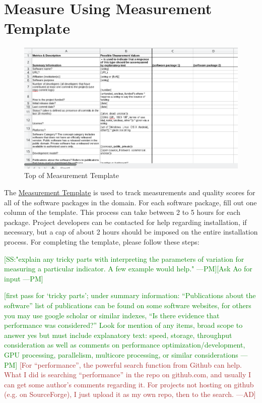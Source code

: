 \documentclass[letterpaper,cleveref]{lipics-v2019}
\newcommand{\authornote}[3]{\textcolor{#1}{[#3 ---#2]}}
\newcommand{\authornote}[3]{}
\newcommand{\pmi}[1]{\authornote{green}{PM}{#1}} %
\newcommand{\ad}[1]{\authornote{brown}{AD}{#1}} %
\theoremstyle{definition}
\begin{document}
\section{Measure Using Measurement Template} \label{SecShallowMeasure}

\begin{figure}[h!]
	\begin{center}
		\includegraphics[width=1.0\textwidth]{measurement_template}
		\caption{Top of Measurement Template}
		\label{measurement_template_image}

	\end{center}
\end{figure}

The \href{https://github.com/smiths/AIMSS/blob/master/StateOfPractice/Methodology/Combined_MeasurementTemplate_EmpiricalMeasures.xlsx}{Measurement Template} is used to track measurements and quality scores for all of the software packages in the domain. For each software package, fill out one column of the template. This process can take between 2 to 5 hours for each package.
Project developers can be contacted for help regarding installation, if necessary, but a cap of about 2 hours should be imposed on the entire installation process. For completing the template, please follow these steps:

\pmi{SS:"explain any tricky parts with interpreting the parameters of variation for measuring a particular indicator. A few example would help."}\pmi{Ask Ao for input}

\pmi{first pass for `tricky parts'; under summary information:
	``Publications about the software''
	list of publications can be found on some software websites, for others you may use google scholar or similar indexes,
``Is there evidence that performance was considered?'' Look for mention of any
items, broad scope to answer yes but must include explanatory text: speed,
storage, throughput consideration as well as comments on performance
optimization/development, GPU processing, parallelism, multicore processing, or
similar considerations} \ad{For ``performance'', the powerful search function
from Github can help. What I did is searching ``performance'' in the repo on
github.com, and usually I can get some author's comments regarding it. For
projects not hosting on github (e.g. on SourceForge), I just upload it as my own
repo, then to the search.}
\end{document}
